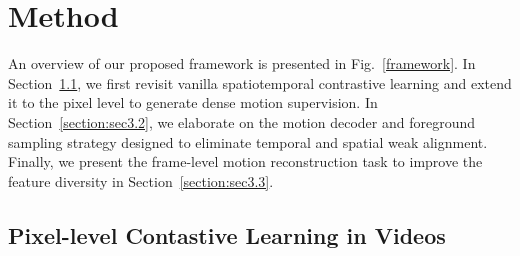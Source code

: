 \documentclass[sigconf,screen]{acmart}
\begin{document}
\section{Method}

 An overview of our proposed framework is presented in Fig.~\ref{framework}. In Section~\ref{section:sec3.1}, we first revisit vanilla spatiotemporal contrastive learning and extend it to the pixel level to generate dense motion supervision. In Section~\ref{section:sec3.2}, we elaborate on the motion decoder and foreground sampling strategy designed to eliminate temporal and spatial weak alignment. Finally, we present the frame-level motion reconstruction task to improve the feature diversity in Section~\ref{section:sec3.3}. 

\subsection{Pixel-level Contastive Learning in Videos} 
\label{section:sec3.1}
\end{document}
